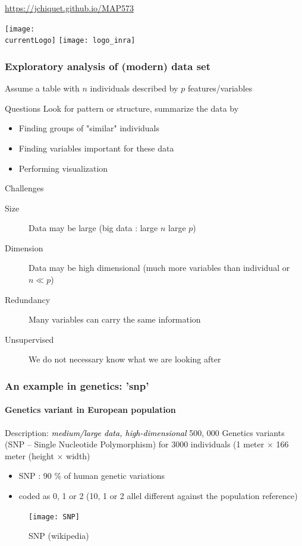 \documentclass{beamer}\usepackage[]{graphicx}\usepackage[]{color}
\title{\currentCourse}
\subtitle{\huge\currentChapter\normalsize}
\institute{\currentInstitute}
\date{\currentDate}
\def\currentLogo{../common_figs/logo_X}
\newcommand{\dotitlepage}{%
  \begin{frame}
    \titlepage
    \vfill
    \begin{center}
        \scriptsize\url{https://jchiquet.github.io/MAP573}
    \end{center}
    \vfill
    \texttt{[image: \\currentLogo]}\hfill
    \texttt{[image: logo\_inra]}
  \end{frame}
}
\begin{document}
\dotitlepage

\begin{frame}
  \frametitle{Exploratory analysis of (modern) data set}

  Assume a table with $n$ individuals described by $p$ features/variables
  
  \vfill
  
  \begin{block}{Questions}
    Look for pattern or structure, summarize the data by
    \begin{itemize}
      \item Finding \alert{groups} of "similar" individuals
      \item Finding variables important for these data
      \item Performing visualization
    \end{itemize}
  \end{block}

  \vfill

  \begin{block}{Challenges}
    \begin{description}
      \item[Size] Data may be \alert{large} (\og big data \og: large $n$ large $p$)    
      \item[Dimension] Data may be \alert{high dimensional} (much more variables than individual or $n \ll p$)    
      \item[Redundancy] Many variables can carry the \alert{same information}
      \item[Unsupervised] We \alert{do not necessary know} what we are looking after
    \end{description}
  \end{block}

\end{frame}

\begin{frame}[fragile]
  \frametitle{An example in genetics: 'snp'}
  \framesubtitle{Genetics variant in European population}

\begin{block}{Description: \textcolor{black}{\it medium/large data, high-dimensional}}
500, 000 Genetics variants (SNP -- Single Nucleotide Polymorphism) for  3000 individuals
(1 meter $\times$ 166 meter (height $\times$ width)
\end{block}

\begin{multicols}{2}
  \begin{itemize}
  \item SNP : 90 \% of human genetic variations
  \item coded as 0, 1 or 2 (10, 1 or 2 allel different against the population reference)
  \end{itemize}

  \begin{figure}
    \centering
     \texttt{[image: SNP]}   
    \caption{SNP (wikipedia)}
  \end{figure}
\end{multicols}

\end{frame}
\end{document}
